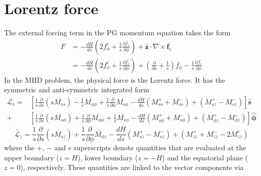 \section{Lorentz force}

The external forcing term in the PG momentum equation takes the form
%
\begin{equation}\label{eqn:Fext-pg}
\begin{aligned}
    F &= -\frac{dH}{ds} \left(2f_\phi^e + \frac{1}{s} \frac{\partial \widetilde{f_z}}{\partial \phi}\right) + \hat{\mathbf{z}}\cdot \nabla\times \overline{\mathbf{f}_e} \\
    &= -\frac{dH}{ds} \left(2f_\phi^e + \frac{1}{s} \frac{\partial \widetilde{f_z}}{\partial \phi}\right) + \left(\frac{\partial}{\partial s} + \frac{1}{s}\right) \overline{f_\phi} - \frac{1}{s} \frac{\partial \overline{f_s}}{\partial \phi}
\end{aligned}
\end{equation}
%
In the MHD problem, the physical force is the Lorentz force. It has the symmetric and anti-symmetric integrated form \citep{jackson_plesio-geostrophy_2020}
\begin{equation}\label{eqn:lorentz-int-pg}
\begin{aligned}
    \overline{\mathcal{L}_e}= & \left[\frac{1}{s} \frac{\partial}{\partial s} \left(s \overline{M_{s s}}\right) - \frac{1}{s} \overline{M_{\phi \phi}} + \frac{1}{s} \frac{\partial}{\partial \phi} \overline{M_{s \phi}} -\frac{d H}{d s}\left(M_{ss}^+ + M_{ss}^-\right) + \left(M_{sz}^+ - M_{sz}^-\right)\right] \hat{\mathbf{s}} \\
    +&\left[\frac{1}{s} \frac{\partial}{\partial s} \left(s\overline{M_{s \phi}}\right)+\frac{1}{s} \frac{\partial}{\partial \phi} \overline{M_{\phi \phi}} + \frac{1}{s} \overline{M_{s \phi}} - \frac{d H}{d s}\left(M_{s \phi}^+ + M_{s \phi}^-\right) + \left(M_{\phi z}^+ - M_{\phi z}^-\right)\right] \hat{\boldsymbol{\phi}}
\end{aligned}
\end{equation}
\begin{equation}
    \widetilde{\mathcal{L}_z}= \frac{1}{s} \frac{\partial}{\partial s}\left(s\widetilde{M_{s z}}\right) + \frac{1}{s} \frac{\partial}{\partial \phi} \widetilde{M_{\phi z}}-\frac{d H}{d s}\left(M_{s z}^+ - M_{s z}^-\right) + \left(M_{zz}^+ + M_{zz}^- - 2 M_{zz}^e\right)
\end{equation}
where the $+$, $-$ and $e$ superscripts denote quantities that are evaluated at the upper boundary ($z=H$), lower boundary ($z=-H$) and the equatorial plane ($z=0$), respectively. These quantities are linked to the vector components via
